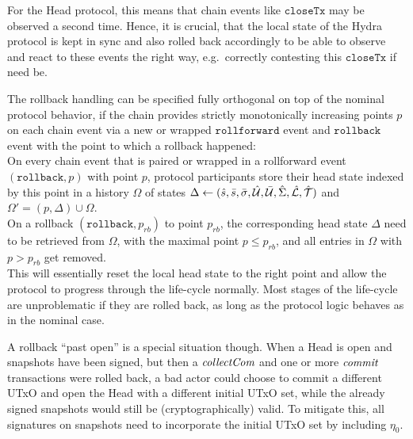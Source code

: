 For the Head protocol, this means that chain events like $\mathtt{closeTx}$ may
be observed a second time. Hence, it is crucial, that the local state of the
Hydra protocol is kept in sync and also rolled back accordingly to be able to
observe and react to these events the right way, e.g.\ correctly contesting this
$\mathtt{closeTx}$ if need be.

The rollback handling can be specified fully orthogonal on top of the nominal
protocol behavior, if the chain provides strictly monotonically increasing
points $p$ on each chain event via a new or wrapped $\mathtt{rollforward}$
event and $\mathtt{rollback}$ event with the point to which a rollback happened:\\

\quad On every chain event that is paired or
wrapped in a rollforward event $(\mathtt{rollback},p)$ with point $p$, protocol
participants store their head state indexed by this point in a history
$\Omega$ of states
$\Delta \gets (\hat s, \bar s, \bar{\sigma}, \hat {\mathcal U}, \bar {\mathcal U}, \hat{\Sigma}, \hat {\mathcal L}, \hat {\mathcal T})$ and $\Omega' = (p, \Delta) \cup \Omega$. \\

\quad On a rollback
$(\mathtt{rollback},p_{rb})$ to point $p_{rb}$, the corresponding head state
$\Delta$ need to be retrieved from $\Omega$, with the maximal point
$p \leq p_{rb}$, and all entries in $\Omega$ with $p > p_{rb}$ get removed. \\

This will essentially reset the local head state to the right point and allow
the protocol to progress through the life-cycle normally. Most stages of the
life-cycle are unproblematic if they are rolled back, as long as the protocol
logic behaves as in the nominal case.

A rollback ``past open'' is a special situation though. When a Head is open and
snapshots have been signed, but then a $\textit{collectCom}$ and one or more
$\textit{commit}$ transactions were rolled back, a bad actor could choose to commit a
different UTxO and open the Head with a different initial UTxO set, while the
already signed snapshots would still be (cryptographically) valid. To mitigate
this, all signatures on snapshots need to incorporate the initial UTxO set by
including $\eta_{0}$.




